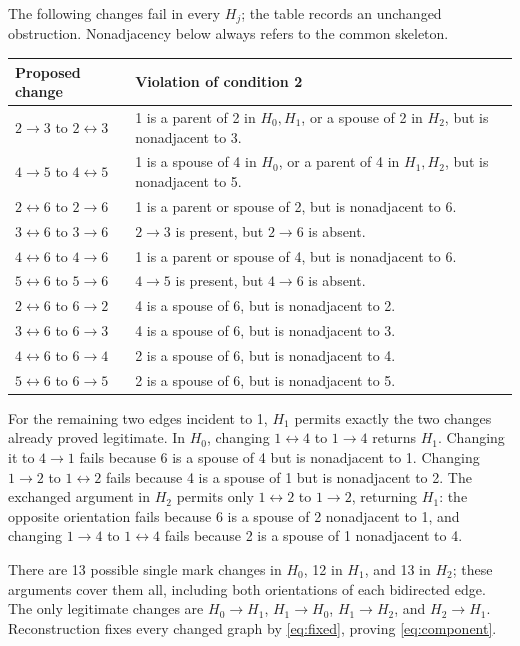 \documentclass[11pt]{article}
\newcommand{\bidir}{\leftrightarrow}
\begin{document}
The following changes fail in every $H_j$; the table records an unchanged
obstruction. Nonadjacency below always refers to the common skeleton.
\begin{center}\small
\begin{tabularx}{\textwidth}{@{}lX@{}}
\toprule
Proposed change&Violation of condition 2\\\midrule
$2\to3$ to $2\bidir3$&1 is a parent of 2 in $H_0,H_1$, or a spouse
of 2 in $H_2$, but is nonadjacent to 3.\\
$4\to5$ to $4\bidir5$&1 is a spouse of 4 in $H_0$, or a parent
of 4 in $H_1,H_2$, but is nonadjacent to 5.\\
$2\bidir6$ to $2\to6$&1 is a parent or spouse of 2, but is nonadjacent to 6.\\
$3\bidir6$ to $3\to6$&$2\to3$ is present, but $2\to6$ is absent.\\
$4\bidir6$ to $4\to6$&1 is a parent or spouse of 4, but is nonadjacent to 6.\\
$5\bidir6$ to $5\to6$&$4\to5$ is present, but $4\to6$ is absent.\\
$2\bidir6$ to $6\to2$&4 is a spouse of 6, but is nonadjacent to 2.\\
$3\bidir6$ to $6\to3$&4 is a spouse of 6, but is nonadjacent to 3.\\
$4\bidir6$ to $6\to4$&2 is a spouse of 6, but is nonadjacent to 4.\\
$5\bidir6$ to $6\to5$&2 is a spouse of 6, but is nonadjacent to 5.\\
\bottomrule
\end{tabularx}
\end{center}
For the remaining two edges incident to 1, $H_1$ permits exactly the
two changes already proved legitimate. In $H_0$, changing $1\bidir4$
to $1\to4$ returns $H_1$. Changing it to $4\to1$ fails because 6 is
a spouse of 4 but is nonadjacent to 1. Changing $1\to2$ to $1\bidir2$
fails because 4 is a spouse of 1 but is nonadjacent to 2.
The exchanged argument in $H_2$ permits only $1\bidir2$ to $1\to2$,
returning $H_1$: the opposite orientation fails because 6 is a spouse of 2
nonadjacent to 1, and changing $1\to4$ to $1\bidir4$ fails because
2 is a spouse of 1 nonadjacent to 4.

There are 13 possible single mark changes in $H_0$, 12 in $H_1$, and 13
in $H_2$; these arguments cover them all, including both orientations of
each bidirected edge. The only legitimate changes are $H_0\to H_1$,
$H_1\to H_0$, $H_1\to H_2$, and $H_2\to H_1$.
Reconstruction fixes every changed graph by \eqref{eq:fixed}, proving
\eqref{eq:component}.
\end{document}

